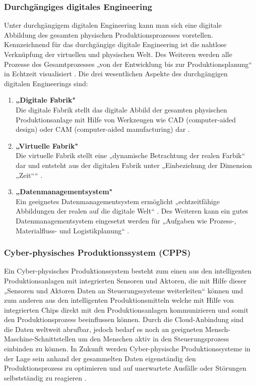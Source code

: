 \subsubsection{Durchgängiges digitales Engineering}\label{sec:DigitalesEngineering}
Unter durchgängigem digitalen Engineering kann man sich eine digitale Abbildung des gesamten physischen Produktionsprozesses vorstellen. Kennzeichnend für das durchgängige digitale Engineering ist die nahtlose Verknüpfung der virtuellen und physischen Welt. Des Weiteren werden alle Prozesse des Gesamtprozesses „von der Entwicklung bis zur Produktionsplanung“ \cite[S.41]{14} in Echtzeit visualisiert \cite[S.41]{14}.
\newline\newline
Die drei wesentlichen Aspekte des durchgängigen digitalen Engineerings sind:
\begin{enumerate}
	\item \textbf{„Digitale Fabrik"} \cite[S.41]{14} \\ 
	Die digitale Fabrik stellt das digitale Abbild der gesamten physischen Produktionsanlage mit Hilfe von Werkzeugen wie CAD (computer-aided design) oder CAM (computer-aided manufacturing) dar \cite[S.41]{14}.
	\item \textbf{„Virtuelle Fabrik"} \cite[S.41]{14} \\
	Die virtuelle Fabrik stellt eine „dynamische Betrachtung der realen Farbik“ \cite[S.41]{14} dar und entsteht aus der digitalen Fabrik unter „Einbeziehung der Dimension „Zeit““ \cite[S.41]{14}.
	\item \textbf{„Datenmanagementsystem"} \cite[S.41]{14} \\
	Ein geeignetes Datenmanagementsystem ermöglicht „echtzeitfähige Abbildungen der realen auf die digitale Welt“ \cite[S.41]{14}. Des Weiteren kann ein gutes Datenmanagementsystem eingesetzt werden für „Aufgaben wie Prozess-, Materialfluss- und Logistikplanung“ \cite[S.41]{14}.
\end{enumerate}

\subsubsection{Cyber-physisches Produktionssystem (CPPS)}\label{sec:CPPS}
Ein Cyber-physisches Produktionssystem besteht zum einen aus den intelligenten Produktionsanlagen mit integrierten Sensoren und Aktoren, die mit Hilfe dieser „Sensoren und Aktoren Daten an Steuerungssysteme weiterleiten“ \cite[S.42]{14} können und zum anderen aus den intelligenten Produktionsmitteln welche mit Hilfe von integrierten Chips direkt mit den Produktionsanlagen kommunizieren und somit den Produktionsprozess beeinflussen können. Durch die Cloud-Anbindung sind die Daten weltweit abrufbar, jedoch bedarf es noch an geeigneten Mensch-Maschine-Schnittstellen um den Menschen aktiv in den Steuerungsprozess einbinden zu können. In Zukunft werden Cyber-physische Produktionssysteme in der Lage sein anhand der gesammelten Daten eigenständig den Produktionsprozess zu optimieren und auf unerwartete Ausfälle oder Störungen selbstständig zu reagieren \cite[S.42]{14}.

